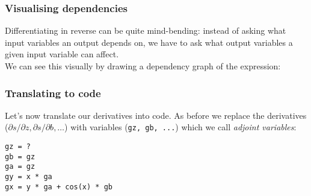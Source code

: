 \documentclass{beamer}
\begin{document}
\begin{frame}
\frametitle{Visualising dependencies}

Differentiating in reverse can be quite mind-bending: instead of asking what input variables an output depends on, we have to ask what output variables a given input variable can affect.
\\[1em]
We can see this visually by drawing a dependency graph of the expression: \\[1em]
\begin{center}
\end{center}

\end{frame}

\begin{frame}[fragile]
\frametitle{Translating to code}

Let's now translate our derivatives into code. As before we replace the derivatives ($\partial s/\partial z, \partial s/\partial b, \dots$) with variables (\lstinline!gz, gb, ...!) which we call \emph{adjoint variables}:

\begin{lstlisting}
gz = ?
gb = gz
ga = gz
gy = x * ga
gx = y * ga + cos(x) * gb
\end{lstlisting}


\end{frame}
\end{document}
